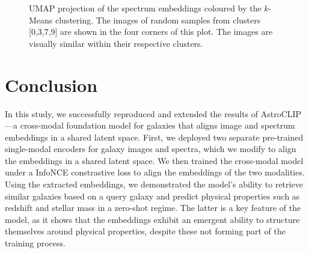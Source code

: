 \documentclass[draft, a4paper,12pt]{article}
\begin{document}
\begin{figure}[H]
    \centering
    \caption{UMAP projection of the spectrum embeddings coloured by the $k$-Means clustering. The images of random samples from clusters [0,3,7,9] are shown in the four corners of this plot. The images are visually similar within their respective clusters.}
    \label{fig:annotated_images}

    
\end{figure}




\section{Conclusion}
In this study, we successfully reproduced and extended the results of AstroCLIP—a cross-modal foundation model for galaxies that aligns image and spectrum embeddings in a shared latent space. First, we deployed two separate pre-trained single-modal encoders for galaxy images and spectra, which we modify to align the embeddings in a shared latent space. We then trained the cross-modal model under a InfoNCE constrastive loss to align the embeddings of the two modalities. Using the extracted embeddings, we demonstrated the model's ability to retrieve similar galaxies based on a query galaxy and predict physical properties such as redshift and stellar mass in a zero-shot regime. The latter is a key feature of the model, as it shows that the embeddings exhibit an emergent ability to structure themselves around physical properties, despite these not forming part of the training process.
\end{document}
